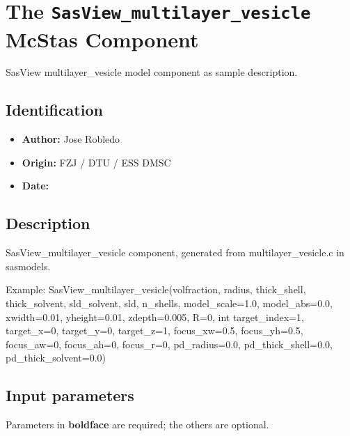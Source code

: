 \section{The \texttt{SasView\_multilayer\_vesicle} McStas Component}
SasView multilayer\_vesicle model component as sample description.

\subsection*{Identification}
\begin{itemize}
  \item \textbf{Author:} Jose Robledo
  \item \textbf{Origin:} FZJ / DTU / ESS DMSC
  \item \textbf{Date:} 
\end{itemize}

\subsection*{Description}
SasView\_multilayer\_vesicle component, generated from multilayer\_vesicle.c in sasmodels.

Example: SasView\_multilayer\_vesicle(volfraction, radius, thick\_shell, thick\_solvent, sld\_solvent, sld, n\_shells, model\_scale=1.0, model\_abs=0.0, xwidth=0.01, yheight=0.01, zdepth=0.005, R=0, int target\_index=1, target\_x=0, target\_y=0, target\_z=1, focus\_xw=0.5, focus\_yh=0.5, focus\_aw=0, focus\_ah=0, focus\_r=0, pd\_radius=0.0, pd\_thick\_shell=0.0, pd\_thick\_solvent=0.0)

\subsection*{Input parameters}
Parameters in \textbf{boldface} are required; the others are optional.

